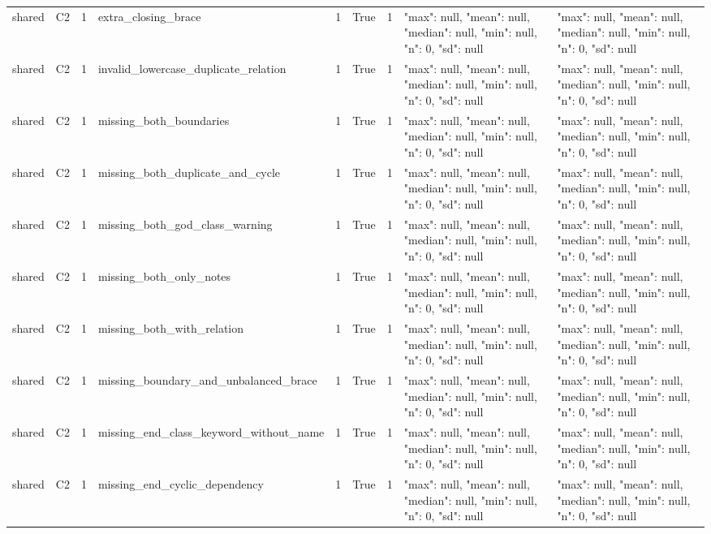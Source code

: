 \begin{tabular}{lllllllll}
shared & C2 & 1 & extra\_closing\_brace & 1 & True & 1 & {"max": null, "mean": null, "median": null, "min": null, "n": 0, "sd": null} & {"max": null, "mean": null, "median": null, "min": null, "n": 0, "sd": null} \\
shared & C2 & 1 & invalid\_lowercase\_duplicate\_relation & 1 & True & 1 & {"max": null, "mean": null, "median": null, "min": null, "n": 0, "sd": null} & {"max": null, "mean": null, "median": null, "min": null, "n": 0, "sd": null} \\
shared & C2 & 1 & missing\_both\_boundaries & 1 & True & 1 & {"max": null, "mean": null, "median": null, "min": null, "n": 0, "sd": null} & {"max": null, "mean": null, "median": null, "min": null, "n": 0, "sd": null} \\
shared & C2 & 1 & missing\_both\_duplicate\_and\_cycle & 1 & True & 1 & {"max": null, "mean": null, "median": null, "min": null, "n": 0, "sd": null} & {"max": null, "mean": null, "median": null, "min": null, "n": 0, "sd": null} \\
shared & C2 & 1 & missing\_both\_god\_class\_warning & 1 & True & 1 & {"max": null, "mean": null, "median": null, "min": null, "n": 0, "sd": null} & {"max": null, "mean": null, "median": null, "min": null, "n": 0, "sd": null} \\
shared & C2 & 1 & missing\_both\_only\_notes & 1 & True & 1 & {"max": null, "mean": null, "median": null, "min": null, "n": 0, "sd": null} & {"max": null, "mean": null, "median": null, "min": null, "n": 0, "sd": null} \\
shared & C2 & 1 & missing\_both\_with\_relation & 1 & True & 1 & {"max": null, "mean": null, "median": null, "min": null, "n": 0, "sd": null} & {"max": null, "mean": null, "median": null, "min": null, "n": 0, "sd": null} \\
shared & C2 & 1 & missing\_boundary\_and\_unbalanced\_brace & 1 & True & 1 & {"max": null, "mean": null, "median": null, "min": null, "n": 0, "sd": null} & {"max": null, "mean": null, "median": null, "min": null, "n": 0, "sd": null} \\
shared & C2 & 1 & missing\_end\_class\_keyword\_without\_name & 1 & True & 1 & {"max": null, "mean": null, "median": null, "min": null, "n": 0, "sd": null} & {"max": null, "mean": null, "median": null, "min": null, "n": 0, "sd": null} \\
shared & C2 & 1 & missing\_end\_cyclic\_dependency & 1 & True & 1 & {"max": null, "mean": null, "median": null, "min": null, "n": 0, "sd": null} & {"max": null, "mean": null, "median": null, "min": null, "n": 0, "sd": null} \\

\end{tabular}

